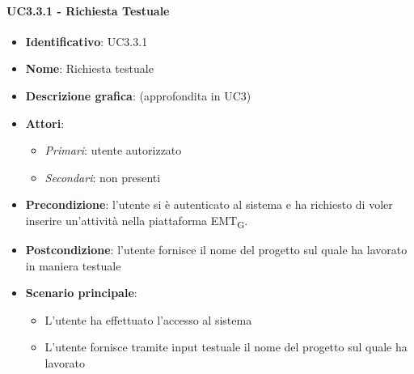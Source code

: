 \paragraph{UC3.3.1 - Richiesta Testuale}
\begin{itemize}
   \item \textbf{Identificativo}: UC3.3.1
   \item \textbf{Nome}: Richiesta testuale
   \item \textbf{Descrizione grafica}: (approfondita in UC3)
   \item \textbf{Attori}:
   \begin{itemize} 
       \item \textit{Primari}: utente autorizzato
       \item \textit{Secondari}: non presenti
   \end{itemize}
       \item \textbf{Precondizione}: l'utente si è autenticato al sistema e ha richiesto di voler inserire un'attività nella piattaforma EMT\textsubscript{G}. 
       \item \textbf{Postcondizione}: l'utente fornisce il nome del progetto sul quale ha lavorato in maniera testuale
    \item \textbf{Scenario principale}: 
       \begin{itemize}
           \item L'utente ha effettuato l'accesso al sistema 
           \item L'utente fornisce tramite input testuale il nome del progetto sul quale ha lavorato
       \end{itemize}
\end{itemize}


